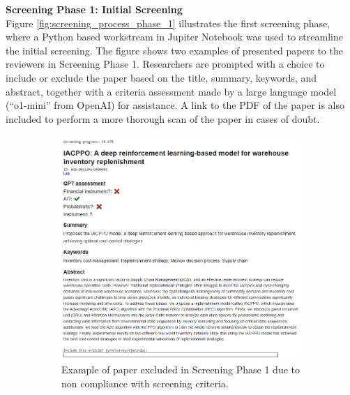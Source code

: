 \textbf{Screening Phase 1: Initial Screening} \\
Figure \ref{fig:screening_process_phase_1} illustrates the first screening phase, where a Python based workstream in Jupiter Notebook was used to streamline the initial screening. The figure shows two examples of presented papers to the reviewers in Screening Phase 1. Researchers are prompted with a choice to include or exclude the paper based on the title, summary, keywords, and abstract, together with a criteria assessment made by a large language model (“o1-mini” from OpenAI) for assistance.  A link to the PDF of the paper is also included to perform a more thorough scan of the paper in cases of doubt.
\begin{figure}[H]
    \centering
     \begin{subfigure}[b]{0.49\textwidth}
         \centering
         \includegraphics[width=\textwidth]{Images/screening_a.png}
         \caption{Example of paper excluded in Screening Phase 1 due to non compliance with screening criteria.}
         \label{fig:screening_phase_1_rejected}
     \end{subfigure}
     \hfill
     \begin{subfigure}[b]{0.49\textwidth}
         \centering

\end{subfigure}
\end{figure}
